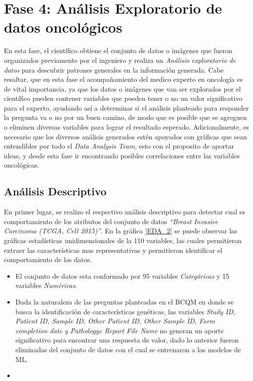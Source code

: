 \section{Fase 4: Análisis Exploratorio de datos oncológicos}

En esta fase, el científico obtiene el conjunto de datos o imágenes que fueron organizados previamente por el ingeniero y realiza un \textit{Análisis exploratorio de datos} para descubrir patrones generales en la información generada. Cabe resaltar, que en esta fase el acompañamiento del medico experto en oncología es de vital importancia, ya que los datos o imágenes que van ser explorados por el científico pueden contener variables que pueden tener o no un valor significativo para el experto, ayudando así a determinar si el análisis planteado para responder la pregunta va o no por un buen camino, de modo que es posible que se agreguen o eliminen diversas variables para lograr el resultado esperado. Adicionalmente, es necesario que los diversos análisis generados estén apoyados con gráficas que sean entendibles por todo el \textit{Data Analysis Team}, esto con el proposito de aportar ideas, y desde esta fase ir encontrando posibles correlaciones entre las variables oncológicas.

\subsection{Análisis Descriptivo}
En primer lugar, se realizo el respectivo análisis descriptivo para detectar cual es comportamiento de los atributos del conjunto de datos \textit{“Breast Invasive Carcinoma (TCGA, Cell 2015)”}. En la gráfica \ref{EDA_2} se puede observar las gráficas estadísticas unidimensionales de la 110 variables, las cuales permitieron extraer  las características mas representativas y permitieron identificar el comportamiento de los datos.

\begin{itemize}[label=\HandPencilLeft]
	\item El conjunto de datos esta conformado por 95 variables \textit{Categóricas} y 15 variables \textit{Numéricas}.
	
	\item Dada la naturaleza de las preguntas planteadas en el BCQM en donde se busca la identificación de características genéticas, las variables \textit{Study ID, Patient ID, Sample ID, Other Patient ID, Other Sample ID, Form completion date y Pathologyc Report File Name} no generan un aporte significativo para encontrar una respuesta de valor, dado lo anterior fueron eliminadas del conjunto de datos con el cual se entrenaron a los modelos de ML.
	
	\item 
\end{itemize}


